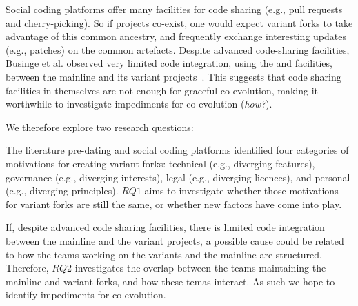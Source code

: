 Social coding platforms offer many facilities for code sharing (e.g., pull requests and cherry-picking).
So if projects co-exist, one would expect variant forks to take advantage of this common ancestry, and frequently exchange interesting updates (e.g., patches) on the common artefacts.
Despite advanced code-sharing facilities, Businge et al. observed very limited code integration, using the \git and \gh facilities, between the mainline and its variant projects~\cite{businge:emse:2021}.
This suggests that code sharing facilities in themselves are not enough for graceful co-evolution, making it worthwhile to investigate impediments for co-evolution (\textit{how?}).


\noindent
We therefore explore two research questions:

\textit{\textbf{\RQOne}}
The literature pre-dating \git and social coding platforms identified four categories of motivations for creating variant forks: technical (e.g., diverging features), governance (e.g., diverging interests), legal (e.g., diverging licences), and personal (e.g., diverging principles).
$RQ1$ aims to investigate whether those motivations for variant forks are still the same, or whether new factors have come into play. 

\textit{\textbf{\RQTwo}}
If, despite advanced code sharing facilities, there is limited code integration between the mainline and the variant projects, a possible cause could be related to how the teams working on the variants and the mainline are structured.
Therefore, $RQ2$ investigates the overlap between the teams maintaining the mainline and variant forks, and how these temas interact.
As such we hope to identify impediments for co-evolution.


